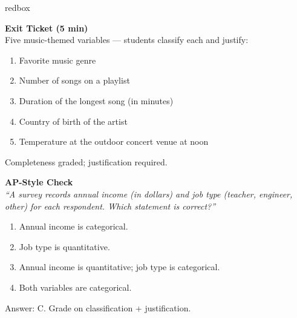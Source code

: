 \documentclass[10pt]{article}
\begin{document}
\begin{skillbox}{redbox}
\begin{minipage}[t]{0.48\linewidth}
    \textbf{Exit Ticket (5 min)}\\
    Five music-themed variables --- students classify each and justify:
    \begin{enumerate}
        \item Favorite music genre
        \item Number of songs on a playlist
        \item Duration of the longest song (in minutes)
        \item Country of birth of the artist
        \item Temperature at the outdoor concert venue at noon
    \end{enumerate}
    \textcolor{slate}{\small Completeness graded; justification required.}
\end{minipage}
\hfill
\begin{minipage}[t]{0.48\linewidth}
    \textbf{AP-Style Check}\\
    \textit{``A survey records annual income (in dollars) and job type
    (teacher, engineer, other) for each respondent. Which statement is
    correct?''}
    \begin{enumerate}[label=(\Alph*),itemsep=2pt]
        \item Annual income is categorical.
        \item Job type is quantitative.
        \item Annual income is quantitative; job type is categorical.
        \item Both variables are categorical.
    \end{enumerate}
    \textcolor{slate}{\small Answer: C. Grade on classification + justification.}
\end{minipage}
\end{skillbox}
\end{document}
